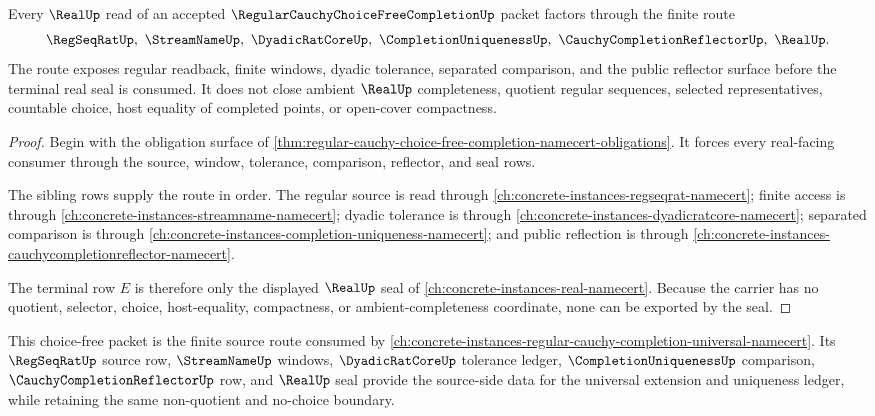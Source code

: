 \begin{theorem}
\label{thm:regular-cauchy-choice-free-completion-real-seal-route}
Every $\RealUp$ read of an accepted $\RegularCauchyChoiceFreeCompletionUp$ packet factors through the finite route
$$
\RegSeqRatUp,\ \StreamNameUp,\ \DyadicRatCoreUp,\ \CompletionUniquenessUp,\ \CauchyCompletionReflectorUp,\ \RealUp .
$$
The route exposes regular readback, finite windows, dyadic tolerance, separated comparison, and the public reflector surface before the terminal real seal is consumed. It does not close ambient $\RealUp$ completeness, quotient regular sequences, selected representatives, countable choice, host equality of completed points, or open-cover compactness.
\end{theorem}
\begin{proof}
Begin with the obligation surface of \autoref{thm:regular-cauchy-choice-free-completion-namecert-obligations}. It forces every real-facing consumer through the source, window, tolerance, comparison, reflector, and seal rows.

The sibling rows supply the route in order. The regular source is read through \autoref{ch:concrete-instances-regseqrat-namecert}; finite access is through \autoref{ch:concrete-instances-streamname-namecert}; dyadic tolerance is through \autoref{ch:concrete-instances-dyadicratcore-namecert}; separated comparison is through \autoref{ch:concrete-instances-completion-uniqueness-namecert}; and public reflection is through \autoref{ch:concrete-instances-cauchycompletionreflector-namecert}.

The terminal row $E$ is therefore only the displayed $\RealUp$ seal of \autoref{ch:concrete-instances-real-namecert}. Because the carrier has no quotient, selector, choice, host-equality, compactness, or ambient-completeness coordinate, none can be exported by the seal.
\end{proof}

This choice-free packet is the finite source route consumed by \autoref{ch:concrete-instances-regular-cauchy-completion-universal-namecert}. Its $\RegSeqRatUp$ source row, $\StreamNameUp$ windows, $\DyadicRatCoreUp$ tolerance ledger, $\CompletionUniquenessUp$ comparison, $\CauchyCompletionReflectorUp$ row, and $\RealUp$ seal provide the source-side data for the universal extension and uniqueness ledger, while retaining the same non-quotient and no-choice boundary.

